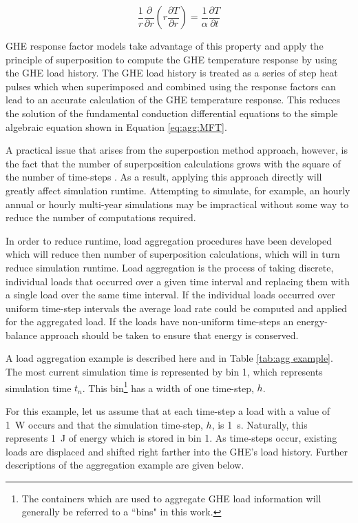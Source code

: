 \documentclass[review,12pt]{elsarticle}
\newcommand{\D}[2]{\frac{\partial #1}{\partial #2}}
\begin{document}
\begin{equation}
	\frac{1}{r} \D{}{r} \left(r \D{T}{r}\right) = \frac{1}{\alpha} \D{T}{t}
	\label{eq:agg:general conduction simplified}
\end{equation}

GHE response factor models take advantage of this property and apply the principle of superposition to compute the GHE temperature response by using the GHE load history. The GHE load history is treated as a series of step heat pulses which when superimposed and combined using the response factors can lead to an accurate calculation of the GHE temperature response. This reduces the solution of the fundamental conduction differential equations to the simple algebraic equation shown in Equation \ref{eq:agg:MFT}.

A practical issue that arises from the superpostion  method approach, however, is the fact that the number of superposition calculations grows with the square of the number of time-steps \citep{YavuzturkSpitler1999}. As a result, applying this approach directly will greatly affect simulation runtime. Attempting to simulate, for example, an hourly annual or hourly multi-year simulations may be impractical without some way to reduce the number of computations required.

In order to reduce runtime, load aggregation procedures have been developed which will reduce then number of superposition calculations, which will in turn reduce simulation runtime. Load aggregation is the process of taking discrete, individual loads that occurred over a given time interval and replacing them with a single load over the same time interval. If the individual loads occurred over uniform time-step intervals the average load rate could be computed and applied for the aggregated load. If the loads have non-uniform time-steps an energy-balance approach should be taken to ensure that energy is conserved.

A load aggregation example is described here and in Table \ref{tab:agg example}. The most current simulation time is represented by bin 1, which represents simulation time $t_n$. This bin\footnote{The containers which are used to aggregate GHE load information will generally be referred to a ``bins" in this work.} has a width of one time-step, $h$.

For this example, let us assume that at each time-step a load with a value of \SI{1}{\watt} occurs and that the simulation time-step, $h$, is \SI{1}{\second}. Naturally, this represents \SI{1}{\joule} of energy which is stored in bin 1. As time-steps occur, existing loads are displaced and shifted right farther into the GHE's load history. Further descriptions of the aggregation example are given below.
\end{document}
